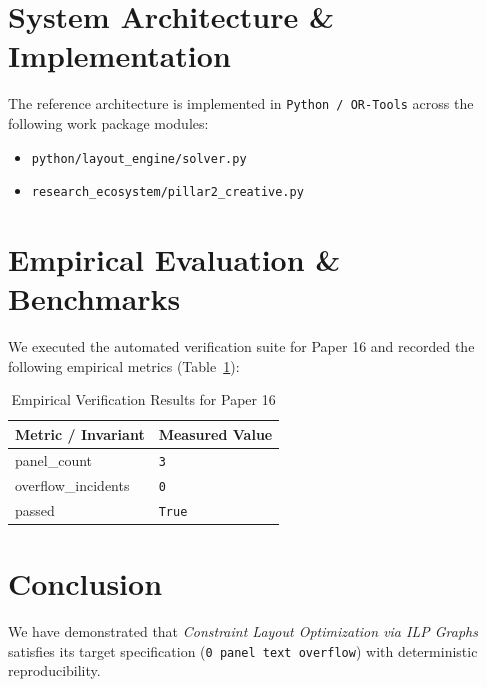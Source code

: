 \documentclass[10pt,twocolumn]{article}
\begin{document}
\section{System Architecture \& Implementation}
The reference architecture is implemented in \texttt{Python / OR-Tools} across the following work package modules:
\begin{itemize}
  \item \texttt{python/layout\_engine/solver.py}
  \item \texttt{research\_ecosystem/pillar2\_creative.py}
\end{itemize}

\section{Empirical Evaluation \& Benchmarks}
We executed the automated verification suite for Paper 16 and recorded the following empirical metrics (Table~\ref{tab:metrics}):

\begin{table}[htbp]
\centering
\caption{Empirical Verification Results for Paper 16}
\label{tab:metrics}
\begin{tabular}{ll}
\toprule
\textbf{Metric / Invariant} & \textbf{Measured Value} \\
\midrule
    panel\_count & \texttt{3} \\
    overflow\_incidents & \texttt{0} \\
    passed & \texttt{True} \\
\bottomrule
\end{tabular}
\end{table}

\section{Conclusion}
We have demonstrated that \textit{Constraint Layout Optimization via ILP Graphs} satisfies its target specification (\texttt{0 panel text overflow}) with deterministic reproducibility.



\end{document}
